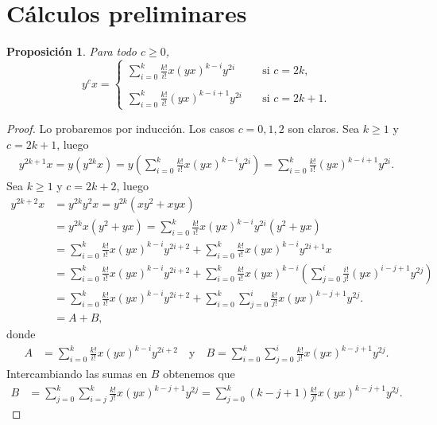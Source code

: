 \documentclass[a4paper,oneside,fleqn,11pt]{article}
\date{23/03/2015}
\newtheorem{prop}{Proposición}
\numberwithin{prop}{subsection}
\begin{document}
\section{Cálculos preliminares}

\begin{prop}
\label{cp_conmutatividad}
Para todo $c \geq 0$,
\[
	y^cx = \left\{\begin{array}{cc}
			\sum_{i = 0}^k\frac{k!}{i!}x(yx)^{k - i}y^{2i} \quad&\text{si } c = 2k,\\
			&\\
			\sum_{i = 0}^k \frac{k!}{i!}(yx)^{k - i + 1}y^{2i} \quad&\text{si } c = 2k + 1.
	\end{array}\right.
\]
\end{prop}
\begin{proof}
Lo probaremos por inducción. Los casos $c = 0, 1, 2$ son claros. 
Sea $k \geq 1$ y $c = 2k + 1$, luego
\begin{align*}
	y^{2k + 1}x = y(y^{2k}x) = y(\sum_{i = 0}^k \frac{k!}{i!}x(yx)^{k - i}y^{2i}) = \sum_{i = 0}^k \frac{k!}{i!}(yx)^{k - i + 1}y^{2i}.
\end{align*}
Sea $k \geq 1$ y $c = 2k + 2$, luego
\begin{align*}
	y^{2k + 2}x &= y^{2k}y^2x = y^{2k}(xy^2 + xyx) \\ 
	&= y^{2k}x(y^2 + yx) = \sum_{i = 0}^k \frac{k!}{i!}x(yx)^{k - i}y^{2i}(y^2 + yx) \\
	&= \sum_{i = 0}^k \frac{k!}{i!}x(yx)^{k - i}y^{2i + 2} + \sum_{i = 0}^k\frac{k!}{i!} x(yx)^{k - i}y^{2i + 1}x \\
	&= \sum_{i = 0}^k \frac{k!}{i!}x(yx)^{k - i}y^{2i + 2}
		+ \sum_{i = 0}^k\frac{k!}{i!} x(yx)^{k - i}\left(\sum_{j = 0}^i\frac{i!}{j!}(yx)^{i - j + 1}y^{2j}\right) \\
	&= \sum_{i = 0}^k \frac{k!}{i!}x(yx)^{k - i}y^{2i + 2}
		+ \sum_{i = 0}^k \sum_{j = 0}^i \frac{k!}{j!} x(yx)^{k - j + 1}y^{2j}. \\
	&= A + B,
\end{align*}
donde
\begin{align*}
	A &= \sum_{i = 0}^k \frac{k!}{i!}x(yx)^{k - i}y^{2i + 2} \quad\text{y}\quad B = \sum_{i = 0}^k \sum_{j = 0}^i \frac{k!}{j!} x(yx)^{k - j + 1}y^{2j}.
\end{align*}
Intercambiando las sumas en $B$ obtenemos que
\begin{align*}
	B &=  \sum_{j = 0}^k \sum_{i = j}^k \frac{k!}{j!} x(yx)^{k - j + 1}y^{2j}  = \sum_{j = 0}^k (k - j + 1)\frac{k!}{j!} x(yx)^{k - j + 1}y^{2j}.
\end{align*}

\end{proof}
\end{document}
